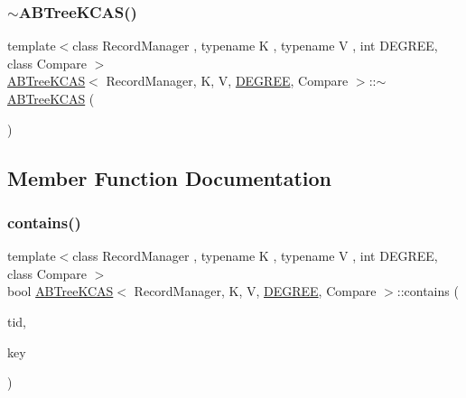 \subsubsection{\texorpdfstring{$\sim$\+A\+B\+Tree\+K\+C\+A\+S()}{~ABTreeKCAS()}}
{\footnotesize\ttfamily template$<$class Record\+Manager , typename K , typename V , int D\+E\+G\+R\+EE, class Compare $>$ \\
\hyperlink{classABTreeKCAS}{A\+B\+Tree\+K\+C\+AS}$<$ Record\+Manager, K, V, \hyperlink{brown__sigouin__abtree__kcas_2adapter_8h_a5d88b17d70c985f2f2b8e987037fd6dd}{D\+E\+G\+R\+EE}, Compare $>$\+::$\sim$\hyperlink{classABTreeKCAS}{A\+B\+Tree\+K\+C\+AS} (\begin{DoxyParamCaption}{ }\end{DoxyParamCaption})}



\subsection{Member Function Documentation}
\mbox{\label{classABTreeKCAS_a620f11222c176da04b8ee4293805e4af}} 
\subsubsection{\texorpdfstring{contains()}{contains()}}
{\footnotesize\ttfamily template$<$class Record\+Manager , typename K , typename V , int D\+E\+G\+R\+EE, class Compare $>$ \\
bool \hyperlink{classABTreeKCAS}{A\+B\+Tree\+K\+C\+AS}$<$ Record\+Manager, K, V, \hyperlink{brown__sigouin__abtree__kcas_2adapter_8h_a5d88b17d70c985f2f2b8e987037fd6dd}{D\+E\+G\+R\+EE}, Compare $>$\+::contains (\begin{DoxyParamCaption}\item[{const int}]{tid,  }\item[{const K \&}]{key }\end{DoxyParamCaption})\hspace{0.3cm}{\ttfamily [inline]}}

\mbox{\label{classABTreeKCAS_a62ba1b3a6bfdf69807cfaa58b4de4f00}} 
